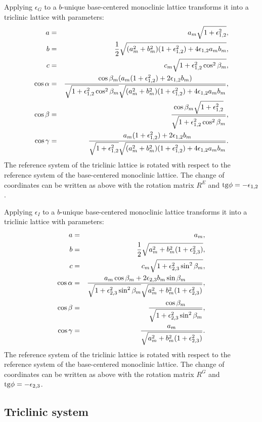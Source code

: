 \documentclass[12pt,a4paper,twoside]{report}
\begin{document}
Applying $\epsilon_G$ to a $b$-unique base-centered monoclinic lattice 
transforms it into a triclinic lattice with parameters:
\begin{eqnarray}
a&=&a_m \sqrt{1+\epsilon_{1,2}^2}, \\
b&=&{1\over 2} \sqrt{(a_m^2+b_m^2)(1+\epsilon_{1,2}^2)+4\epsilon_{1,2}a_mb_m},\\
c&=&c_m \sqrt{1+\epsilon_{1,2}^2 \cos^2\beta_m}, \\
\cos\alpha &=& {\cos\beta_m (a_m (1+\epsilon_{1,2}^2)+2\epsilon_{1,2}b_m) 
\over 
\sqrt{1+\epsilon_{1,2}^2 \cos^2\beta_m} \sqrt{(a_m^2+b_m^2)(1+\epsilon_{1,2}^2)+4\epsilon_{1,2}a_mb_m}}, \\
\cos\beta &=& {\cos\beta_m \sqrt{1+\epsilon_{1,2}^2} \over
\sqrt{1+\epsilon_{1,2}^2 \cos^2\beta_m}}, \\
\cos\gamma &=& {a_m (1+\epsilon_{1,2}^2)+2\epsilon_{1,2}b_m 
\over 
\sqrt{1+\epsilon_{1,2}^2} \sqrt{(a_m^2+b_m^2)(1+\epsilon_{1,2}^2)+4\epsilon_{1,2}a_mb_m}}.
\end{eqnarray}
The reference system of the triclinic lattice is rotated 
with respect to the reference system of the base-centered
monoclinic lattice. 
The change of coordinates can be written as above with the rotation matrix 
$R^E$ and ${\rm tg}\phi=-\epsilon_{1,2}$.

Applying $\epsilon_I$ to a $b$-unique base-centered monoclinic lattice 
transforms it into a triclinic lattice with parameters:
\begin{eqnarray}
a&=&a_m, \\
b&=&{1\over 2} \sqrt{a_m^2+b_m^2(1+\epsilon_{2,3}^2)},\\
c&=&c_m \sqrt{1+\epsilon_{2,3}^2 \sin^2\beta_m}, \\
\cos\alpha &=& {a_m\cos\beta_m +2\epsilon_{2,3}b_m \sin \beta_m 
\over 
\sqrt{1+\epsilon_{2,3}^2 \sin^2\beta_m} 
\sqrt{a_m^2+b_m^2(1+\epsilon_{2,3}^2)}}, \\
\cos\beta &=& {\cos\beta_m \over
\sqrt{1+\epsilon_{2,3}^2 \sin^2\beta_m}}, \\
\cos\gamma &=& {a_m  
\over 
\sqrt{a_m^2+b_m^2(1+\epsilon_{2,3}^2)}}.
\end{eqnarray}
The reference system of the triclinic lattice is rotated 
with respect to the reference system of the base-centered
monoclinic lattice. 
The change of coordinates can be written as above with the rotation matrix 
$R^G$ and ${\rm tg}\phi=-\epsilon_{2,3}$.

{\color{web-blue}\subsection{Triclinic system}}
\color{black}
\end{document}
